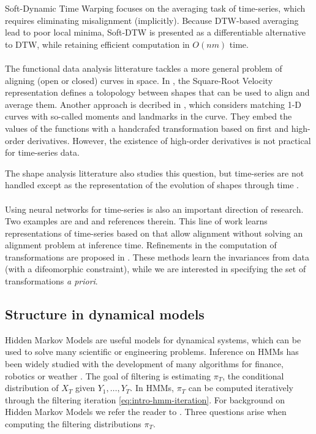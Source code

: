 Soft-Dynamic Time Warping \citep{soft-dtw} focuses on the averaging task of time-series, which requires eliminating misalignment (implicitly). Because DTW-based averaging lead to poor local minima, Soft-DTW is presented as a differentiable alternative to DTW, while retaining efficient computation in $O(nm)$ time.

\paragraph{}
The functional data analysis litterature tackles a more general problem of aligning (open or closed) curves in space. In \cite{srvf}, the Square-Root Velocity representation defines a tolopology between shapes that can be used to align and average them. Another approach is decribed in \cite{curve-moments}, which considers matching 1-D curves with so-called moments and landmarks in the curve. They embed the values of the functions with a handcrafed transformation based on first and high-order derivatives. However, the existence of high-order derivatives is not practical for time-series data.

The shape analysis litterature also studies this question, but time-series are not handled except as the representation of the evolution of shapes through time \citep{2108.05634,Durrleman2013}.

\paragraph{} Using neural networks for time-series is also an important direction of research. Two examples are \cite{2106.11911} and \cite{dtan} and references therein. This line of work learns representations of time-series based on \cite{pavf} that allow alignment without solving an alignment problem at inference time. Refinements in the computation of transformations are proposed in \cite{martinez22a}. These methods learn the invariances from data (with a difeomorphic constraint), while we are interested in specifying the set of transformations \emph{a priori}.

\subsection{Structure in dynamical models}
Hidden Markov Models are useful models for dynamical systems, which can be used to solve many scientific or engineering problems. Inference on HMMs has been widely studied with the development of many algorithms for finance, robotics or weather \citep{cappehmm}. The goal of filtering is estimating $\pi_T$, the conditional distribution of $X_T$ given $Y_1, \ldots, Y_T$. In HMMs, $\pi_T$ can be computed iteratively through the filtering iteration \cref{eq:intro-hmm-iteration}. For background on Hidden Markov Models we refer the reader to \cite{cappehmm}. Three questions arise when computing the filtering distributions $\pi_T$.

